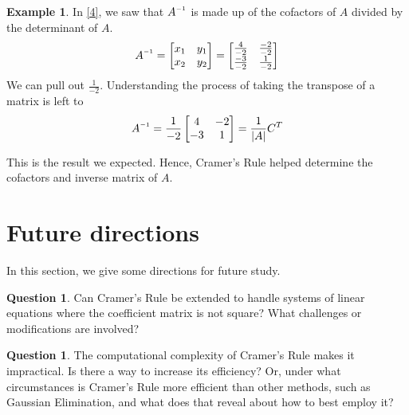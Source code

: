 \documentclass[11pt,reqno]{amsart}
\theoremstyle{definition}
\newtheorem{question}[theorem]{Question}
\newtheorem{example}[theorem]{Example}
\newcommand{\inv}{^{\raisebox{.2ex}{$\scriptscriptstyle-1$}}}
\begin{document}
\begin{example}
In \ref{4}, we saw that $A\inv$ is made up of the cofactors of $A$ divided by the determinant of $A$.
\[
A\inv = 
 \begin{bmatrix}
        x_1 & y_1\\
        x_2 & y_2\\
    \end{bmatrix}
    = 
    \begin{bmatrix}
        \frac{4}{-2} &\frac{-2}{-2}\\
        \frac{-3}{-2} & \frac{1}{-2}\\
    \end{bmatrix}
\]
We can pull out $\frac{1}{-2}$. Understanding the process of taking the transpose of a matrix is left to \cite[Chapter 2.7]{strang}
\[
A\inv = \frac{1}{-2} \begin{bmatrix}
    4 & -2\\
    -3 & 1\\
\end{bmatrix} = \frac{1}{|A|}C^T
\]

This is the result we expected. Hence, Cramer's Rule helped determine the cofactors and inverse matrix of $A$.
\end{example}

\section{Future directions}
\label{sec:directions}

In this section, we give some directions for future study.

\begin{question}
Can Cramer's Rule be extended to handle systems of linear equations where the coefficient matrix is not square? What challenges or modifications are involved?
\end{question}


\begin{question}
The computational complexity of Cramer's Rule makes it impractical. Is there a way to increase its efficiency? Or, under what circumstances is Cramer's Rule more efficient than other methods, such as Gaussian Elimination, and what does that reveal about how to best employ it?
\end{question}






\end{document}
